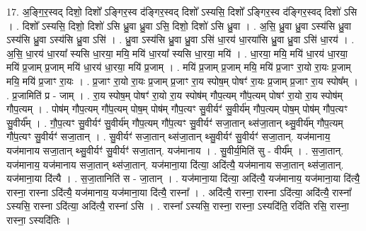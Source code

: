 \documentclass[17pt]{extarticle}
\begin{document}
17. अ॒ङ्गि॒र॒स्वद् दिशो॒ दिशो᳚ ऽङ्गिर॒स्व द॑ङ्गिर॒स्वद् दिशो᳚ ऽस्यसि॒ दिशो᳚ ऽङ्गिर॒स्व द॑ङ्गिर॒स्वद् दिशो॑ ऽसि । . दिशो᳚ ऽस्यसि॒ दिशो॒ दिशो॑ ऽसि ध्रु॒वा ध्रु॒वा ऽसि॒ दिशो॒ दिशो॑ ऽसि ध्रु॒वा । . अ॒सि॒ ध्रु॒वा ध्रु॒वा ऽस्य॑सि ध्रु॒वा ऽस्य॑सि ध्रु॒वा ऽस्य॑सि ध्रु॒वा ऽसि॑ । . ध्रु॒वा ऽस्य॑सि ध्रु॒वा ध्रु॒वा ऽसि॑ धा॒रय॑ धा॒रया॑सि ध्रु॒वा ध्रु॒वा ऽसि॑ धा॒रय॑ । . अ॒सि॒ धा॒रय॑ धा॒रया᳚ स्यसि धा॒रया॒ मयि॒ मयि॑ धा॒रया᳚ स्यसि धा॒रया॒ मयि॑ । . धा॒रया॒ मयि॒ मयि॑ धा॒रय॑ धा॒रया॒ मयि॑ प्र॒जाम् प्र॒जाम् मयि॑ धा॒रय॑ धा॒रया॒ मयि॑ प्र॒जाम् । . मयि॑ प्र॒जाम् प्र॒जाम् मयि॒ मयि॑ प्र॒जाꣳ रा॒यो रा॒यः प्र॒जाम् मयि॒ मयि॑ प्र॒जाꣳ रा॒यः । . प्र॒जाꣳ रा॒यो रा॒यः प्र॒जाम् प्र॒जाꣳ रा॒य स्पोष॒म् पोषꣳ॑ रा॒यः प्र॒जाम् प्र॒जाꣳ रा॒य स्पोष᳚म् । . प्र॒जामिति॑ प्र - जाम् । . रा॒य स्पोष॒म् पोषꣳ॑ रा॒यो रा॒य स्पोष॑म् गौप॒त्यम् गौ॑प॒त्यम् पोषꣳ॑ रा॒यो रा॒य स्पोष॑म् गौप॒त्यम् । . पोष॑म् गौप॒त्यम् गौ॑प॒त्यम् पोष॒म् पोष॑म् गौप॒त्यꣳ सु॒वीर्यꣳ॑ सु॒वीर्य॑म् गौप॒त्यम् पोष॒म् पोष॑म् गौप॒त्यꣳ सु॒वीर्य᳚म् । . गौ॒प॒त्यꣳ सु॒वीर्यꣳ॑ सु॒वीर्य॑म् गौप॒त्यम् गौ॑प॒त्यꣳ सु॒वीर्यꣳ॑ सजा॒तान् थ्स॑जा॒तान् थ्सु॒वीर्य॑म् गौप॒त्यम् गौ॑प॒त्यꣳ सु॒वीर्यꣳ॑ सजा॒तान् । . सु॒वीर्यꣳ॑ सजा॒तान् थ्स॑जा॒तान् थ्सु॒वीर्यꣳ॑ सु॒वीर्यꣳ॑ सजा॒तान्. यज॑मानाय॒ यज॑मानाय सजा॒तान् थ्सु॒वीर्यꣳ॑ सु॒वीर्यꣳ॑ सजा॒तान्. यज॑मानाय । . सु॒वीर्य॒मिति॑ सु - वीर्य᳚म् । . स॒जा॒तान्. यज॑मानाय॒ यज॑मानाय सजा॒तान् थ्स॑जा॒तान्. यज॑माना॒या दि॑त्या॒ अदि॑त्यै॒ यज॑मानाय सजा॒तान् थ्स॑जा॒तान्. यज॑माना॒या दि॑त्यै । . स॒जा॒तानिति॑ स - जा॒तान् । . यज॑माना॒या दि॑त्या॒ अदि॑त्यै॒ यज॑मानाय॒ यज॑माना॒या दि॑त्यै॒ रास्ना॒ रास्ना ऽदि॑त्यै॒ यज॑मानाय॒ यज॑माना॒या दि॑त्यै॒ रास्ना᳚ । . अदि॑त्यै॒ रास्ना॒ रास्ना ऽदि॑त्या॒ अदि॑त्यै॒ रास्ना᳚ ऽस्यसि॒ रास्ना ऽदि॑त्या॒ अदि॑त्यै॒ रास्ना॑ ऽसि । . रास्ना᳚ ऽस्यसि॒ रास्ना॒ रास्ना॒ ऽस्यदि॑ति॒ रदि॑ति रसि॒ रास्ना॒ रास्ना॒ ऽस्यदि॑तिः । \newline
\end{document}
